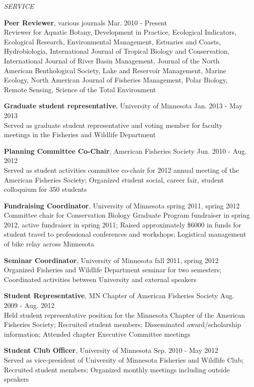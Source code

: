\documentclass[letterpaper,12pt]{article}
\newcommand{\sectitle}[1]{\vspace{\baselineskip} \centerline{\large{\textit{#1}}}}
\begin{document}
\sectitle{SERVICE}

{\bf Peer Reviewer}, various journals \hfill Mar. 2010 - Present \\
Reviewer for Aquatic Botany, Development in Practice, Ecological Indicators, Ecological Research, Environmental Management, Estuaries and Coasts, Hydrobiologia, International Journal of Tropical Biology and Conservation, International Journal of River Basin Management, Journal of the North American Benthological Society, Lake and Reservoir Management, Marine Ecology, North American Journal of Fisheries Management, Polar Biology, Remote Sensing, Science of the Total Environment

{\bf Graduate student representative}, University of Minnesota \hfill Jan. 2013 - May 2013 \\
Served as graduate student representative and voting member for faculty meetings in the Fisheries and Wildlife Department

{\bf Planning Committee Co-Chair}, American Fisheries Society \hfill Jun. 2010 - Aug. 2012 \\
Served as student activities committee co-chair for 2012 annual meeting of the American Fisheries Society; Organized student social, career fair, student colloquium for 350 students

{\bf Fundraising Coordinator}, University of Minnesota \hfill spring 2011, spring 2012 \\
Committee chair for Conservation Biology Graduate Program fundraiser in spring 2012, active fundraiser in spring 2011; Raised approximately \$6000 in funds for student travel to professional conferences and workshops; Logistical management of bike relay across Minnesota

{\bf Seminar Coordinator}, University of Minnesota \hfill fall 2011, spring 2012 \\
Organized Fisheries and Wildlife Department seminar for two semesters; Coordinated activities between University and external speakers

{\bf Student Representative}, MN Chapter of American Fisheries Society \hfill Aug. 2009 - Aug. 2012 \\
Held student representative position for the Minnesota Chapter of the American Fisheries Society; Recruited student members; Disseminated award/scholarship information; Attended chapter Executive Committee meetings

{\bf Student Club Officer}, University of Minnesota \hfill Sep. 2010 - May 2012 \\
Served as vice-president of University of Minnesota Fisheries and Wildlife Club; Recruited student members; Organized monthly meetings including outside speakers
\end{document}
